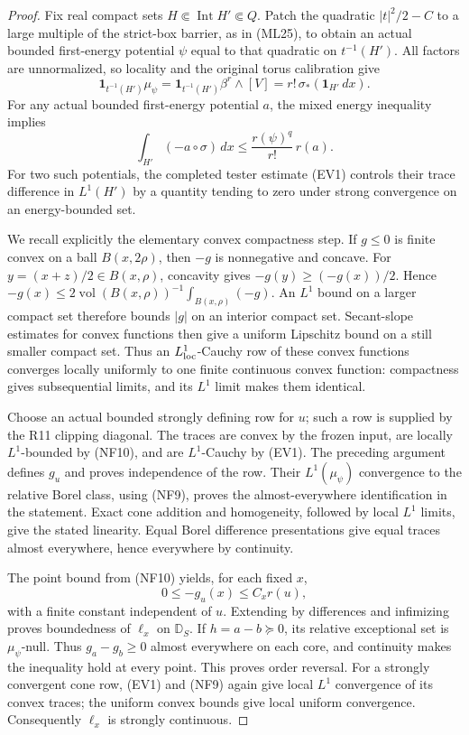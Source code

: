 \documentclass[11pt,a4paper]{article}
\numberwithin{equation}{section}
\theoremstyle{definition}
\theoremstyle{remark}
\begin{document}
\begin{proof}
Fix real compact sets $H\Subset\operatorname{Int}H'\Subset Q$.
Patch the quadratic $|t|^2/2-C$ to a large multiple of the
strict-box barrier, as in (ML25), to obtain an actual
bounded first-energy potential $\psi$ equal to that quadratic
on $t^{-1}(H')$. All factors are unnormalized, so locality
and the original torus calibration give
\[
           \mathbf1_{t^{-1}(H')}\mu_\psi
                   =\mathbf1_{t^{-1}(H')}\beta^r\wedge[V]
                   =r!\,\sigma_*(\mathbf1_{H'}\,dx).
 \tag{NF9}
\]
For any actual bounded first-energy potential $a$,
the mixed energy inequality implies
\[
              \int_{H'}(-a\circ\sigma)\,dx
                          \leq\frac{r(\psi)^q}{r!}\,r(a).
 \tag{NF10}
\]
For two such potentials, the completed tester estimate
(EV1) controls their trace difference in $L^1(H')$ by
a quantity tending to zero under strong convergence on
an energy-bounded set.

We recall explicitly the elementary convex compactness step.
If $g\leq0$ is finite convex on a ball $B(x,2\rho)$,
then $-g$ is nonnegative and concave. For
$y=(x+z)/2\in B(x,\rho)$, concavity gives
$-g(y)\geq(-g(x))/2$. Hence
$-g(x)\leq2\operatorname{vol}(B(x,\rho))^{-1}
\int_{B(x,\rho)}(-g)$. An $L^1$ bound on a larger
compact set therefore bounds $|g|$ on an interior compact
set. Secant-slope estimates for convex functions then give
a uniform Lipschitz bound on a still smaller compact set.
Thus an $L^1_{\rm loc}$-Cauchy row of these convex functions
converges locally uniformly to one finite continuous convex
function: compactness gives subsequential limits, and its
$L^1$ limit makes them identical.

Choose an actual bounded strongly defining row for $u$;
such a row is supplied by the R11 clipping diagonal.
The traces are convex by the frozen input, are locally
$L^1$-bounded by (NF10), and are $L^1$-Cauchy by (EV1).
The preceding argument defines $g_u$ and proves independence
of the row. Their $L^1(\mu_\psi)$ convergence to the
relative Borel class, using (NF9), proves the almost-everywhere
identification in the statement. Exact cone addition and
homogeneity, followed by local $L^1$ limits, give the stated
linearity. Equal Borel difference presentations give equal
traces almost everywhere, hence everywhere by continuity.

The point bound from (NF10) yields, for each fixed $x$,
\[
                     0\leq-g_u(x)\leq C_x r(u),
 \tag{NF11}
\]
with a finite constant independent of $u$. Extending by
differences and infimizing proves boundedness of $\ell_x$
on $\mathbb D_S$. If $h=a-b\succeq0$, its relative
exceptional set is $\mu_\psi$-null. Thus
$g_a-g_b\geq0$ almost everywhere on each core, and continuity
makes the inequality hold at every point. This proves order
reversal. For a strongly convergent cone row, (EV1) and
(NF9) again give local $L^1$ convergence of its convex
traces; the uniform convex bounds give local uniform
convergence. Consequently $\ell_x$ is strongly continuous.


\end{proof}
\end{document}
